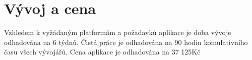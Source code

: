 \documentclass[FM,SP]{tulthesis}
\begin{document}
\section{Vývoj a cena}
Vzhledem k vyžádaným platformám a požadavků aplikace je doba vývoje odhadována na 6 týdnů. Čistá práce je odhadována na 90 hodin komulativního času všech vývojářů. Cena aplikace je odhadována na 37 125Kč

\nocite{*}



\renewcommand{\indexname}{Přehled příkazů, prostředí a voleb}
\printindex


\end{document}

